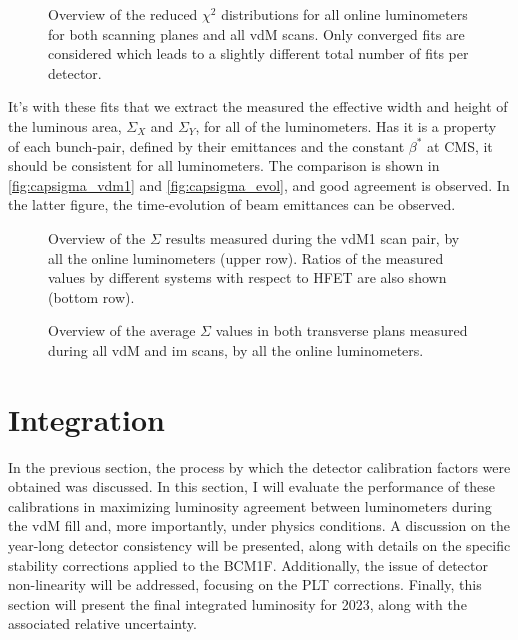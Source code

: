 \begin{figure}[!htb]
	\centering
	\caption[Scan fits reduced $\chi^2$ distribution]{Overview of the reduced $\chi^2$ distributions for all online luminometers for both scanning planes and all vdM scans. Only converged fits are considered which leads to a slightly different total number of fits per detector.}
	\label{fig:chi2_distributions}
\end{figure}

It's with these fits that we extract the measured the effective width and height of the luminous area, $\Sigma_X$ and $\Sigma_Y$, for all of the luminometers. Has it is a property of each bunch-pair, defined by their emittances and the constant $\beta^{*}$ at CMS, it should be consistent for all luminometers. The comparison is shown in \autoref{fig:capsigma_vdm1} and \autoref{fig:capsigma_evol}, and good agreement is observed. In the latter figure, the time-evolution of beam emittances can be observed.

\begin{figure}[!htb]
	\centering
	\caption[Overview of the measured effective beam overlap widths]{Overview of the $\Sigma$ results measured during the vdM1 scan pair, by all the online luminometers (upper row). Ratios of the measured values by different systems with respect to HFET are also shown (bottom row).}
	\label{fig:capsigma_vdm1}
\end{figure}

\begin{figure}[!htb]
	\centering
	\caption{Overview of the average $\Sigma$ values in both transverse plans measured during all vdM and im scans, by all the online luminometers.}
	\label{fig:capsigma_evol}
\end{figure}

\newpage

\section{Integration}

In the previous section, the process by which the detector calibration factors were obtained was discussed. In this section, I will evaluate the performance of these calibrations in maximizing luminosity agreement between luminometers during the vdM fill and, more importantly, under physics conditions. A discussion on the year-long detector consistency will be presented, along with details on the specific stability corrections applied to the BCM1F. Additionally, the issue of detector non-linearity will be addressed, focusing on the PLT corrections. Finally, this section will present the final integrated luminosity for 2023, along with the associated relative uncertainty.

